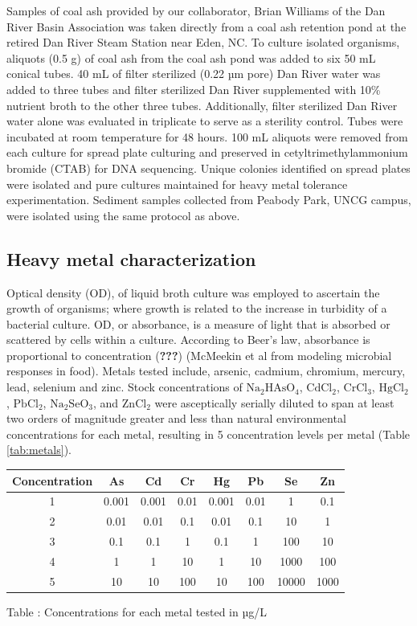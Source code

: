 \documentclass[ms]{uncgdissertationexp}
\theoremstyle{plain}
\theoremstyle{definition}
\theoremstyle{remark}
\begin{document}
  Samples of coal ash provided by our collaborator, Brian Williams of the
  Dan River Basin Association was taken directly from a coal ash retention
  pond at the retired Dan River Steam Station near Eden, NC. To culture
  isolated organisms, aliquots (0.5 g) of coal ash from the coal ash pond
  was added to six 50 mL conical tubes. 40 mL of filter sterilized (0.22
  µm pore) Dan River water was added to three tubes and filter sterilized
  Dan River supplemented with 10\% nutrient broth to the other three
  tubes. Additionally, filter sterilized Dan River water alone was
  evaluated in triplicate to serve as a sterility control. Tubes were
  incubated at room temperature for 48 hours. 100 mL aliquots were removed
  from each culture for spread plate culturing and preserved in
  cetyltrimethylammonium bromide (CTAB) for DNA sequencing. Unique
  colonies identified on spread plates were isolated and pure cultures
  maintained for heavy metal tolerance experimentation. Sediment samples
  collected from Peabody Park, UNCG campus, were isolated using the same
  protocol as above.
  
  \subsection{Heavy metal
  characterization}\label{heavy-metal-characterization}
  
  Optical density (OD), of liquid broth culture was employed to ascertain
  the growth of organisms; where growth is related to the increase in
  turbidity of a bacterial culture. OD, or absorbance, is a measure of
  light that is absorbed or scattered by cells within a culture. According
  to Beer's law, absorbance is proportional to concentration
  ({\textbf{???}}) (McMeekin et al from modeling microbial responses in
  food). Metals tested include, arsenic, cadmium, chromium, mercury, lead,
  selenium and zinc. Stock concentrations of \(\mathrm{Na_2HAsO_4}\),
  \(\mathrm{CdCl_2}\), \(\mathrm{CrCl_3}\), \(\mathrm{HgCl_2}\),
  \(\mathrm{PbCl_2}\), \(\mathrm{Na_2SeO_3}\), and \(\mathrm{ZnCl_2}\)
  were asceptically serially diluted to span at least two orders of
  magnitude greater and less than natural environmental concentrations for
  each metal, resulting in 5 concentration levels per metal (Table
  \ref{tab:metals}).
  \begin{longtable}[]{@{}cccccccc@{}}
  \toprule
  Concentration & As & Cd & Cr & Hg & Pb & Se & Zn\tabularnewline
  \midrule
  \endhead
  1 & 0.001 & 0.001 & 0.01 & 0.001 & 0.01 & 1 & 0.1\tabularnewline
  2 & 0.01 & 0.01 & 0.1 & 0.01 & 0.1 & 10 & 1\tabularnewline
  3 & 0.1 & 0.1 & 1 & 0.1 & 1 & 100 & 10\tabularnewline
  4 & 1 & 1 & 10 & 1 & 10 & 1000 & 100\tabularnewline
  5 & 10 & 10 & 100 & 10 & 100 & 10000 & 1000\tabularnewline
  \bottomrule
  \end{longtable}
  Table \label{tab:metals}: Concentrations for each metal tested in µg/L
  
\end{document}
